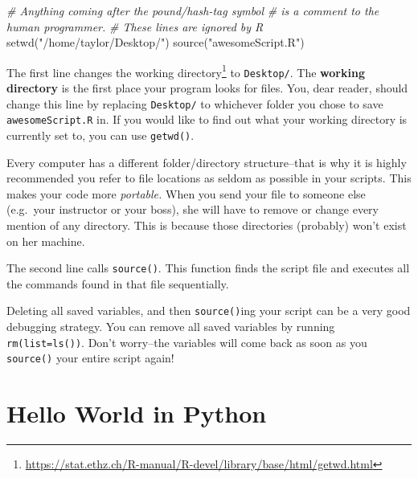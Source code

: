 \documentclass[
  12pt,
  krantz2]{krantz}
\makeatletter
\newenvironment{Shaded}{\begin{snugshade}}{\end{snugshade}}
\newcommand{\CommentTok}[1]{\textcolor[rgb]{0.37,0.37,0.37}{\textit{#1}}}
\newcommand{\FunctionTok}[1]{\textcolor[rgb]{0,0,0}{#1}}
\newcommand{\NormalTok}[1]{#1}
\newcommand{\StringTok}[1]{\textcolor[rgb]{0.5,0.5,0.5}{#1}}
\renewcommand{\href}[2]{#2\footnote{\url{#1}}}
\newenvironment{kframe}{%
\medskip{}
\setlength{\fboxsep}{.8em}
 \def\at@end@of@kframe{}%
 \ifinner\ifhmode%
  \def\at@end@of@kframe{\end{minipage}}%
  \begin{minipage}{\columnwidth}%
 \fi\fi%
 \def\FrameCommand##1{\hskip\@totalleftmargin \hskip-\fboxsep
 \colorbox{shadecolor}{##1}\hskip-\fboxsep
     \hskip-\linewidth \hskip-\@totalleftmargin \hskip\columnwidth}%
 \MakeFramed {\advance\hsize-\width
   \@totalleftmargin\z@ \linewidth\hsize
   \@setminipage}}%
 {\par\unskip\endMakeFramed%
 \at@end@of@kframe}
\renewenvironment{Shaded}{\begin{kframe}}{\end{kframe}}
\makeatother
\begin{document}
\begin{Shaded}
\begin{Highlighting}[]
\CommentTok{\# Anything coming after the pound/hash{-}tag symbol}
\CommentTok{\# is a comment to the human programmer.}
\CommentTok{\# These lines are ignored by R}
\FunctionTok{setwd}\NormalTok{(}\StringTok{"/home/taylor/Desktop/"}\NormalTok{)}
\FunctionTok{source}\NormalTok{(}\StringTok{"awesomeScript.R"}\NormalTok{)}
\end{Highlighting}
\end{Shaded}

The first line changes the \href{https://stat.ethz.ch/R-manual/R-devel/library/base/html/getwd.html}{working directory} to \texttt{Desktop/}. The \textbf{working directory} is the first place your program looks for files. You, dear reader, should change this line by replacing \texttt{Desktop/} to whichever folder you chose to save \texttt{awesomeScript.R} in. If you would like to find out what your working directory is currently set to, you can use \texttt{getwd()}.

\begin{rmd-details}
Every computer has a different folder/directory structure--that is why it is highly recommended you refer to file locations as seldom as possible in your scripts. This makes your code more \emph{portable.} When you send your file to someone else (e.g.~your instructor or your boss), she will have to remove or change every mention of any directory. This is because those directories (probably) won't exist on her machine.

\end{rmd-details}

The second line calls \texttt{source()}. This function finds the script file and executes all the commands found in that file sequentially.

\begin{rmd-details}
Deleting all saved variables, and then \texttt{source()}ing your script can be a very good debugging strategy. You can remove all saved variables by running \texttt{rm(list=ls())}. Don't worry--the variables will come back as soon as you \texttt{source()} your entire script again!

\end{rmd-details}

\hypertarget{hello-world-in-python}{%
\section{Hello World in Python}\label{hello-world-in-python}}
\end{document}
